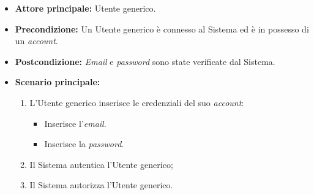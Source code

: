 \label{usecase:Effettua accesso tradizionale}
\begin{itemize}

	\item \textbf{Attore principale:} Utente generico.

	\item \textbf{Precondizione:} Un Utente generico è connesso al Sistema ed è in possesso di un \textit{account}.

	\item \textbf{Postcondizione:} \textit{Email} e \textit{password} sono state verificate dal Sistema.

	\item \textbf{Scenario principale:}
	\begin{enumerate}
		\item L'Utente generico inserisce le credenziali del suo \textit{account}:
		\begin{itemize}
            \item Inserisce l'\textit{email}.
            \item Inserisce la \textit{password}.
        \end{itemize}
		\item Il Sistema autentica l'Utente generico;
		\item Il Sistema autorizza l'Utente generico.
	\end{enumerate}

\end{itemize}